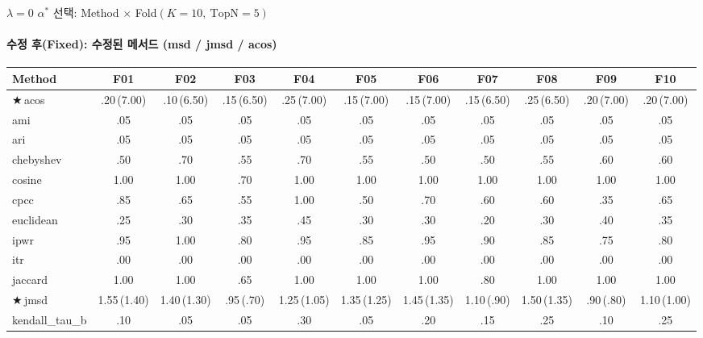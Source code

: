 \documentclass[aspectratio=169,10pt]{beamer}
\begin{document}
\begin{frame}[shrink=20]{$\lambda=0$\; $\alpha^*$ 선택: Method $\times$ Fold\quad $(K=10,\ \mathrm{TopN}=5)$}
	\framesubtitle{수정 후(Fixed): 수정된 메서드 (msd / jmsd / acos)}
	\centering
	\renewcommand{\arraystretch}{1.20}
	\small
	\begin{tabular}{@{}l@{\quad}c@{\quad}c@{\quad}c@{\quad}c@{\quad}c@{\quad}c@{\quad}c@{\quad}c@{\quad}c@{\quad}c@{}}
		\toprule
		Method & F01 & F02 & F03 & F04 & F05 & F06 & F07 & F08 & F09 & F10 \\
		\midrule
		\rowcolor{posblue!18}
		{\color{posblue}★}\,acos & .20\,{\color{negred}(7.00)} & .10\,{\color{negred}(6.50)} & .15\,{\color{negred}(6.50)} & .25\,{\color{negred}(7.00)} & .15\,{\color{negred}(7.00)} & .15\,{\color{negred}(7.00)} & .15\,{\color{negred}(6.50)} & .25\,{\color{negred}(6.50)} & .20\,{\color{negred}(7.00)} & .20\,{\color{negred}(7.00)} \\
		ami        & .05 & .05 & .05 & .05 & .05 & .05 & .05 & .05 & .05 & .05 \\
		ari        & .05 & .05 & .05 & .05 & .05 & .05 & .05 & .05 & .05 & .05 \\
		chebyshev  & .50 & .70 & .55 & .70 & .55 & .50 & .50 & .55 & .60 & .60 \\
		cosine     & 1.00 & 1.00 & .70 & 1.00 & 1.00 & 1.00 & 1.00 & 1.00 & 1.00 & 1.00 \\
		cpcc       & .85 & .65 & .55 & 1.00 & .50 & .70 & .60 & .60 & .35 & .65 \\
		euclidean  & .25 & .30 & .35 & .45 & .30 & .30 & .20 & .30 & .40 & .35 \\
		ipwr       & .95 & 1.00 & .80 & .95 & .85 & .95 & .90 & .85 & .75 & .80 \\
		itr        & .00 & .00 & .00 & .00 & .00 & .00 & .00 & .00 & .00 & .00 \\
		jaccard    & 1.00 & 1.00 & .65 & 1.00 & 1.00 & 1.00 & .80 & 1.00 & 1.00 & 1.00 \\
		\rowcolor{posblue!18}
		{\color{posblue}★}\,jmsd & 1.55\,{\color{negred}(1.40)} & 1.40\,{\color{negred}(1.30)} & .95\,{\color{negred}(.70)} & 1.25\,{\color{negred}(1.05)} & 1.35\,{\color{negred}(1.25)} & 1.45\,{\color{negred}(1.35)} & 1.10\,{\color{negred}(.90)} & 1.50\,{\color{negred}(1.35)} & .90\,{\color{negred}(.80)} & 1.10\,{\color{negred}(1.00)} \\
		kendall\_tau\_b & .10 & .05 & .05 & .30 & .05 & .20 & .15 & .25 & .10 & .25 \\

\end{tabular}
\end{frame}
\end{document}
